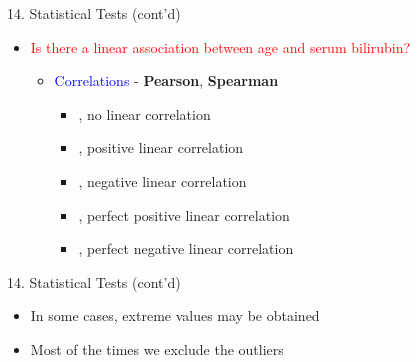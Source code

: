 \documentclass[14pt, aspectratio=169, sectionpage=simple, xclolor=table]{beamer}
\begin{document}
\begin{frame}[fragile]{14. Statistical Tests (cont'd)}
\begin{itemize}
\item \textcolor{red}{Is there a linear association between age and serum bilirubin?}
\begin{itemize}
\item \textcolor{blue}{Correlations} - \textbf{Pearson}, \textbf{Spearman}
\vspace{1ex}
\vspace{1ex}
\begin{itemize}
\item {}, no linear correlation
\item {}, positive linear correlation
\item {}, negative linear correlation
\item {}, perfect positive linear correlation
\item {}, perfect negative linear correlation
\end{itemize}
\end{itemize}
\end{itemize}
\end{frame}
\begin{frame}[fragile]{14. Statistical Tests (cont'd)}
\begin{itemize}
\item In some cases, extreme values may be obtained
\vspace{1ex}
\vspace{1ex}
\item Most of the times we exclude the outliers
\end{itemize}
\end{frame}
\end{document}

